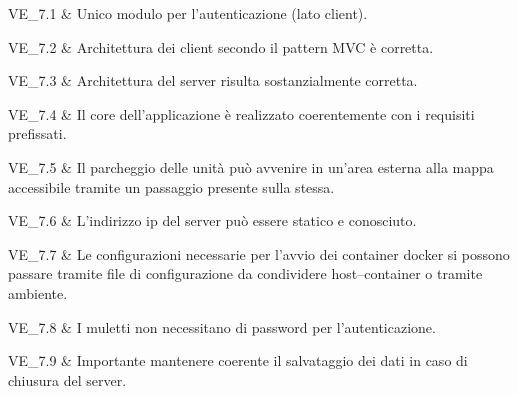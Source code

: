 VE\_7.1 & Unico modulo per l'autenticazione (lato client).

\tabularnewline
VE\_7.2 & Architettura dei client secondo il pattern MVC è corretta.

\tabularnewline
VE\_7.3 & Architettura del server risulta sostanzialmente corretta.

\tabularnewline
VE\_7.4 & Il core dell'applicazione è realizzato coerentemente con i requisiti prefissati.

\tabularnewline
VE\_7.5 & Il parcheggio delle unità può avvenire in un'area esterna alla mappa accessibile tramite un passaggio presente sulla stessa.

\tabularnewline
VE\_7.6 & L'indirizzo ip del server può essere statico e conosciuto.

\tabularnewline
VE\_7.7 & Le configurazioni necessarie per l'avvio dei container docker si possono passare tramite file di configurazione da condividere host--container o tramite ambiente.

\tabularnewline
VE\_7.8 & I muletti non necessitano di password per l'autenticazione.

\tabularnewline
VE\_7.9 & Importante mantenere coerente il salvataggio dei dati in caso di chiusura del server.
